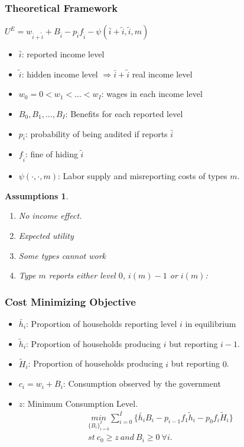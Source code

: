\documentclass[xcolor=pdftex,dvipsnames,table]{beamer}
\newtheorem{assum}{Assumptions}
\begin{document}
\begin{frame}[label=theory]
 \frametitle{Theoretical Framework}
 \begin{center}
$U^E=w_{\bar{i}+\tilde{i}}+B_{\bar{i}}-p_{\bar{i}}f_{\tilde{i}}-\psi(\bar{i}+\tilde{i},\tilde{i},m)$ 
 \end{center}
\pause
\begin{itemize}
\item $\bar{i}$: reported income level 
\item $\tilde{i}$: hidden income level $\Rightarrow \bar{i}+\tilde{i}$ real income level
\item $w_0=0<w_1<...<w_I$: wages in each income level 
\pause
\item $B_0,B_1,...,B_I$: Benefits for each reported level
\pause
\item $p_{\bar{i}}$: probability of being audited if reports $\bar{i}$
\item $f_{\tilde{i}}$: fine of hiding $\tilde{i}$
\pause
\item $\psi(\cdot,\cdot,m)$: Labor supply and misreporting costs of types $m$.
\end{itemize}
\pause
 \begin{assum}
\begin{enumerate}
\item No income effect. 
\item Expected utility 
\item Some types cannot work
\pause
\item Type $m$ reports either level $0$, $i(m)-1$ or $i(m)$:
\end{enumerate}
\end{assum}
\hyperlink{implications}{}
\end{frame}

\begin{frame}[label=imp]
 \frametitle{Cost Minimizing Objective}
\begin{itemize}
\item $\bar{h}_i$: Proportion of households reporting level $i$ in equilibrium
\item $\tilde{h}_i$: Proportion of households producing $i$ but reporting $i-1$.
\item $\tilde{H}_i$: Proportion of households producing $i$ but reporting $0$.
\pause
\item $c_i=w_i+B_i$: Consumption observed by the government
\pause
\item $z$: Minimum Consumption Level.
\pause
\begin{align*}
	\underset{\{B_i\}_{i=0}^I}{min} \sum_{i=0}^I \{\bar{h}_iB_i-p_{i-1}f_1\tilde{h}_i-p_0f_i\tilde{H}_i\} \nonumber\\
	st\ c_0 \geq z\ and\ B_i\geq0\ \forall i. \nonumber
\end{align*}
\end{itemize}
\end{frame}
\end{document}
